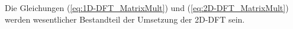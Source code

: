 Die Gleichungen (\ref{eq:1D-DFT_MatrixMult}) und (\ref{eq:2D-DFT_MatrixMult}) werden wesentlicher Bestandteil der Umsetzung der 2D-DFT sein.
% 
%   


